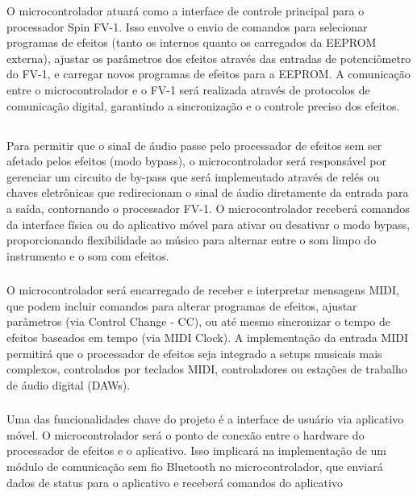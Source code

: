 O microcontrolador atuará como a interface de controle principal para o processador Spin FV-1. Isso envolve o envio de comandos para selecionar programas de efeitos (tanto os internos quanto os carregados da EEPROM externa), ajustar os parâmetros dos efeitos através das entradas de potenciômetro do FV-1, e carregar novos programas de efeitos para a EEPROM. A comunicação entre o microcontrolador e o FV-1 será realizada através de protocolos de comunicação digital, garantindo a sincronização e o controle preciso dos efeitos.

\subsection{}

Para permitir que o sinal de áudio passe pelo processador de efeitos sem ser afetado pelos efeitos (modo bypass), o microcontrolador será responsável por gerenciar um circuito de by-pass que será implementado através de relés ou chaves eletrônicas que redirecionam o sinal de áudio diretamente da entrada para a saída, contornando o processador FV-1. O microcontrolador receberá comandos da interface física ou do aplicativo móvel para ativar ou desativar o modo bypass, proporcionando flexibilidade ao músico para alternar entre o som limpo do instrumento e o som com efeitos.

\subsubsection{}

O microcontrolador será encarregado de receber e interpretar mensagens MIDI, que podem incluir comandos para alterar programas de efeitos, ajustar parâmetros (via Control Change - CC), ou até mesmo sincronizar o tempo de efeitos baseados em tempo (via MIDI Clock). A implementação da entrada MIDI permitirá que o processador de efeitos seja integrado a setups musicais mais complexos, controlados por teclados MIDI, controladores ou estações de trabalho de áudio digital (DAWs).

\subsubsection{}

Uma das funcionalidades chave do projeto é a interface de usuário via aplicativo móvel. O microcontrolador será o ponto de conexão entre o hardware do processador de efeitos e o aplicativo. Isso implicará na implementação de um módulo de comunicação sem fio Bluetooth no microcontrolador, que enviará dados de status para o aplicativo e receberá comandos do aplicativo 

